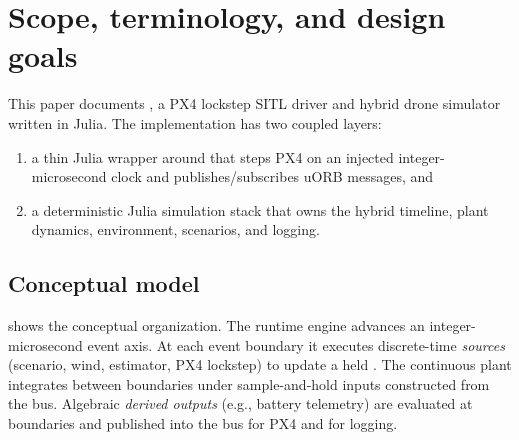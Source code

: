 \section{Scope, terminology, and design goals}
\label{sec:intro}

This paper documents , a PX4 lockstep SITL driver and hybrid drone simulator written in Julia. The implementation has two coupled layers:
\begin{enumerate}[leftmargin=*]
  \item a thin Julia wrapper around  that steps PX4 on an injected integer-microsecond clock and publishes/subscribes uORB messages, and
  \item a deterministic Julia simulation stack that owns the hybrid timeline, plant dynamics, environment, scenarios, and logging.
\end{enumerate}

\subsection{Conceptual model}
\label{sec:intro-conceptual}

 shows the conceptual organization. The runtime engine advances an integer-microsecond event axis. At each event boundary it executes discrete-time \emph{sources} (scenario, wind, estimator, PX4 lockstep) to update a held . The continuous plant integrates between boundaries under sample-and-hold inputs constructed from the bus. Algebraic \emph{derived outputs} (e.g., battery telemetry) are evaluated at boundaries and published into the bus for PX4 and for logging.

